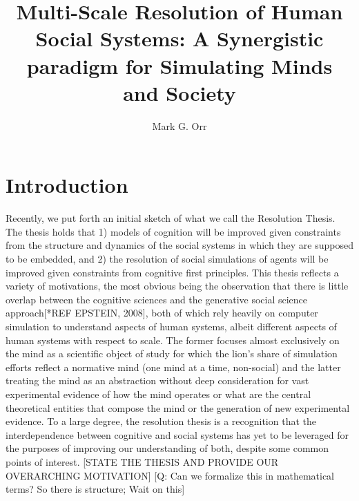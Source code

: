 \documentclass{article}
\title{Multi-Scale Resolution of Human Social Systems:  A Synergistic paradigm for Simulating Minds and Society}
\author{Mark G. Orr}
\begin{document}
\maketitle

\section{Introduction}
Recently, we put forth an initial sketch of what we call the Resolution Thesis.  The thesis holds that 1) models of cognition will be improved given constraints from the structure and dynamics of the social systems in which they are supposed to be embedded, and 2) the resolution of social simulations of agents will be improved given constraints from cognitive first principles.  This thesis reflects a variety of motivations, the most obvious being the observation that there is little overlap between the cognitive sciences and the generative social science approach[*REF EPSTEIN, 2008], both of which rely heavily on computer simulation to understand aspects of human systems, albeit different aspects of human systems with respect to scale.  The former focuses almost exclusively on the mind as a scientific object of study for which the lion's share of simulation efforts reflect a normative mind (one mind at a time, non-social) and the latter treating the mind as an abstraction without deep consideration for vast experimental evidence of how the mind operates or what are the central theoretical entities that compose the mind or the generation of new experimental evidence.  To a large degree, the resolution thesis is a recognition that the interdependence between cognitive and social systems has yet to be leveraged for the purposes of improving our understanding of both, despite some common points of interest.    
[STATE THE THESIS AND PROVIDE OUR OVERARCHING MOTIVATION]
[Q: Can we formalize this in mathematical terms? So there is structure; Wait on this]
\end{document}
